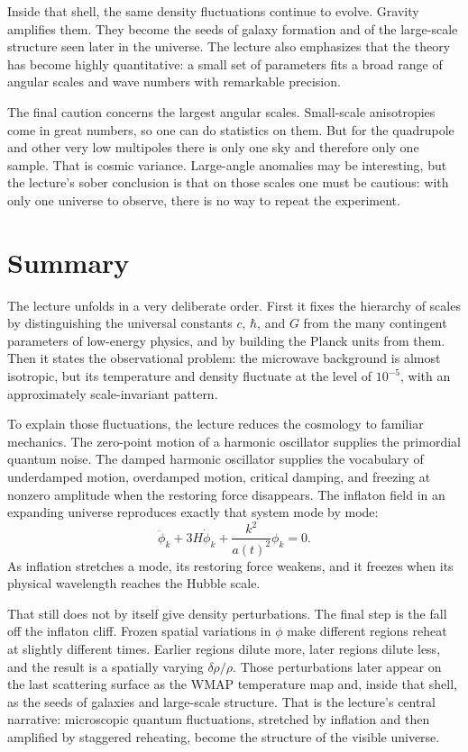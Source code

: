 Inside that shell, the same density fluctuations continue to evolve. Gravity amplifies them. They become the seeds of galaxy formation and of the large-scale structure seen later in the universe. The lecture also emphasizes that the theory has become highly quantitative: a small set of parameters fits a broad range of angular scales and wave numbers with remarkable precision.

The final caution concerns the largest angular scales. Small-scale anisotropies come in great numbers, so one can do statistics on them. But for the quadrupole and other very low multipoles there is only one sky and therefore only one sample. That is cosmic variance. Large-angle anomalies may be interesting, but the lecture's sober conclusion is that on those scales one must be cautious: with only one universe to observe, there is no way to repeat the experiment.

\section{Summary}

The lecture unfolds in a very deliberate order. First it fixes the hierarchy of scales by distinguishing the universal constants \(c\), \(\hbar\), and \(G\) from the many contingent parameters of low-energy physics, and by building the Planck units from them. Then it states the observational problem: the microwave background is almost isotropic, but its temperature and density fluctuate at the level of \(10^{-5}\), with an approximately scale-invariant pattern.

To explain those fluctuations, the lecture reduces the cosmology to familiar mechanics. The zero-point motion of a harmonic oscillator supplies the primordial quantum noise. The damped harmonic oscillator supplies the vocabulary of underdamped motion, overdamped motion, critical damping, and freezing at nonzero amplitude when the restoring force disappears. The inflaton field in an expanding universe reproduces exactly that system mode by mode:
\begin{equation}
\ddot\phi_k+3H\dot\phi_k+\frac{k^2}{a(t)^2}\phi_k=0.
\end{equation}
As inflation stretches a mode, its restoring force weakens, and it freezes when its physical wavelength reaches the Hubble scale.

That still does not by itself give density perturbations. The final step is the fall off the inflaton cliff. Frozen spatial variations in \(\phi\) make different regions reheat at slightly different times. Earlier regions dilute more, later regions dilute less, and the result is a spatially varying \(\delta\rho/\rho\). Those perturbations later appear on the last scattering surface as the WMAP temperature map and, inside that shell, as the seeds of galaxies and large-scale structure. That is the lecture's central narrative: microscopic quantum fluctuations, stretched by inflation and then amplified by staggered reheating, become the structure of the visible universe.